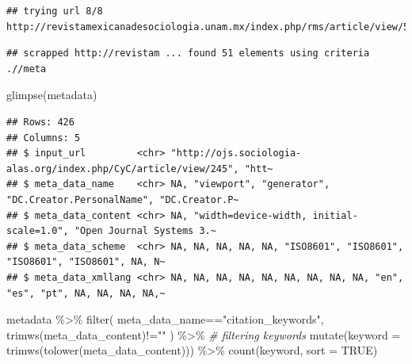 \documentclass[
]{book}
\newenvironment{Shaded}{\begin{snugshade}}{\end{snugshade}}
\newcommand{\AttributeTok}[1]{\textcolor[rgb]{0.77,0.63,0.00}{#1}}
\newcommand{\CommentTok}[1]{\textcolor[rgb]{0.56,0.35,0.01}{\textit{#1}}}
\newcommand{\ConstantTok}[1]{\textcolor[rgb]{0.00,0.00,0.00}{#1}}
\newcommand{\FunctionTok}[1]{\textcolor[rgb]{0.00,0.00,0.00}{#1}}
\newcommand{\NormalTok}[1]{#1}
\newcommand{\SpecialCharTok}[1]{\textcolor[rgb]{0.00,0.00,0.00}{#1}}
\newcommand{\StringTok}[1]{\textcolor[rgb]{0.31,0.60,0.02}{#1}}
\begin{document}
\begin{verbatim}
## trying url 8/8 http://revistamexicanadesociologia.unam.mx/index.php/rms/article/view/57723
\end{verbatim}

\begin{verbatim}
## scrapped http://revistam ... found 51 elements using criteria .//meta
\end{verbatim}

\begin{Shaded}
\begin{Highlighting}[]
\FunctionTok{glimpse}\NormalTok{(metadata)}
\end{Highlighting}
\end{Shaded}

\begin{verbatim}
## Rows: 426
## Columns: 5
## $ input_url         <chr> "http://ojs.sociologia-alas.org/index.php/CyC/article/view/245", "htt~
## $ meta_data_name    <chr> NA, "viewport", "generator", "DC.Creator.PersonalName", "DC.Creator.P~
## $ meta_data_content <chr> NA, "width=device-width, initial-scale=1.0", "Open Journal Systems 3.~
## $ meta_data_scheme  <chr> NA, NA, NA, NA, NA, "ISO8601", "ISO8601", "ISO8601", "ISO8601", NA, N~
## $ meta_data_xmllang <chr> NA, NA, NA, NA, NA, NA, NA, NA, NA, "en", "es", "pt", NA, NA, NA, NA,~
\end{verbatim}

\begin{Shaded}
\begin{Highlighting}[]
\NormalTok{metadata }\SpecialCharTok{\%\textgreater{}\%} 
  \FunctionTok{filter}\NormalTok{(}
\NormalTok{      meta\_data\_name}\SpecialCharTok{==}\StringTok{"citation\_keywords"}\NormalTok{, }
      \FunctionTok{trimws}\NormalTok{(meta\_data\_content)}\SpecialCharTok{!=}\StringTok{""}
\NormalTok{    ) }\SpecialCharTok{\%\textgreater{}\%} \CommentTok{\# filtering keywords}
  \FunctionTok{mutate}\NormalTok{(}\AttributeTok{keyword =} \FunctionTok{trimws}\NormalTok{(}\FunctionTok{tolower}\NormalTok{(meta\_data\_content))) }\SpecialCharTok{\%\textgreater{}\%}
  \FunctionTok{count}\NormalTok{(keyword, }\AttributeTok{sort =} \ConstantTok{TRUE}\NormalTok{) }
\end{Highlighting}
\end{Shaded}
\end{document}
